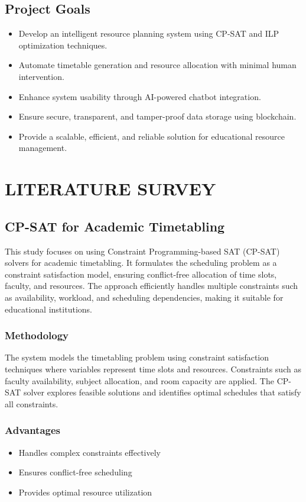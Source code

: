 \documentclass[a4paper, 12pt]{report}
\begin{document}
\section{Project Goals}
\begin{itemize}
    \item Develop an intelligent resource planning system using CP-SAT and ILP optimization techniques.
    \item Automate timetable generation and resource allocation with minimal human intervention.
    \item Enhance system usability through AI-powered chatbot integration.
    \item Ensure secure, transparent, and tamper-proof data storage using blockchain.
    \item Provide a scalable, efficient, and reliable solution for educational resource management.
\end{itemize}
\chapter{LITERATURE SURVEY}
\singlespacing

\section{CP-SAT for Academic Timetabling}
\par This study focuses on using Constraint Programming-based SAT (CP-SAT) solvers for academic timetabling. It formulates the scheduling problem as a constraint satisfaction model, ensuring conflict-free allocation of time slots, faculty, and resources. The approach efficiently handles multiple constraints such as availability, workload, and scheduling dependencies, making it suitable for educational institutions.

\subsection{Methodology}
\par The system models the timetabling problem using constraint satisfaction techniques where variables represent time slots and resources. Constraints such as faculty availability, subject allocation, and room capacity are applied. The CP-SAT solver explores feasible solutions and identifies optimal schedules that satisfy all constraints.

\subsection{Advantages}
\begin{itemize}
    \item Handles complex constraints effectively
    \item Ensures conflict-free scheduling
    \item Provides optimal resource utilization
\end{itemize}
\end{document}
